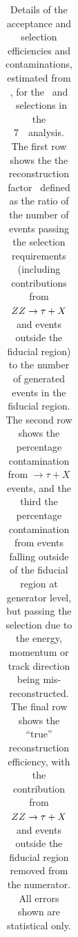 \begin{table}[htbp]
\begin{tabular}{p{3.5cm}llll}
	\hline\hline
    \end{tabular}
    \caption{Details of the acceptance and selection
    efficiencies and contaminations, estimated from \mc, for the \ZZ\ and \ZZs\
    selections in the 7~\tev\ analysis. The first row shows the the
    reconstruction factor \CZZ\, defined as the ratio of the number of events
    passing the selection requirements (including contributions from $ZZ
    \rightarrow \tau+X$ and events outside the fiducial region) to the number
    of generated events in the fiducial region.  The second row shows the
    percentage contamination from $\rightarrow \tau+X$ events, and the third
    the percentage contamination from events falling outside of the fiducial
    region at generator level, but passing the selection due to the energy,
    momentum or track direction being mis-reconstructed.  The final row shows
    the ``true'' reconstruction efficiency, with the contribution from $ZZ
    \rightarrow \tau+X$ and events outside the fiducial region removed from the
    numerator.  All errors shown are statistical only.}
    \label{table:objSel-czz-seven}
\end{table}

